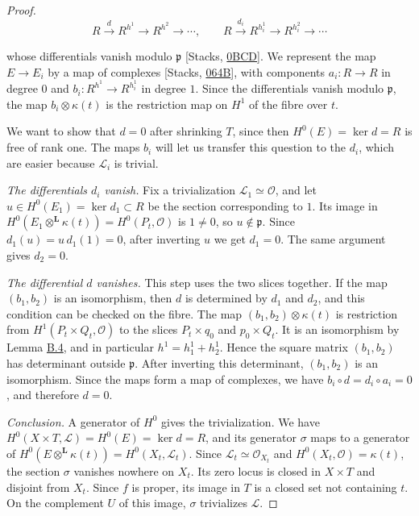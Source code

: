 \documentclass[11pt]{article}
\begin{document}
\begin{proof}[{Proof}]
\[
R\xrightarrow{d}R^{h^1}\to R^{h^2}\to\cdots,\qquad
R\xrightarrow{d_i}R^{h_i^1}\to R^{h_i^2}\to\cdots
\]

whose differentials vanish modulo \(\mathfrak p\) [Stacks, \href{https://stacks.math.columbia.edu/tag/0BCD}{0BCD}]. We represent the map \(E\to E_i\) by a map of complexes [Stacks, \href{https://stacks.math.columbia.edu/tag/064B}{064B}], with components \(a_i:R\to R\) in degree \(0\) and \(b_i:R^{h^1}\to R^{h_i^1}\) in degree \(1\). Since the differentials vanish modulo \(\mathfrak p\), the map \(b_i\otimes\kappa(t)\) is the restriction map on \(H^1\) of the fibre over \(t\).

We want to show that \(d=0\) after shrinking \(T\), since then \(H^0(E)=\ker d=R\) is free of rank one. The maps \(b_i\) will let us transfer this question to the \(d_i\), which are easier because \(\mathcal L_i\) is trivial.

\emph{The differentials \(d_i\) vanish.} Fix a trivialization \(\mathcal L_1\simeq\mathcal O\), and let \(u\in H^0(E_1)=\ker d_1\subset R\) be the section corresponding to \(1\). Its image in \(H^0(E_1\otimes^{\mathbf L}\kappa(t))=H^0(P_t,\mathcal O)\) is \(1\ne0\), so \(u\notin\mathfrak p\). Since \(d_1(u)=u\,d_1(1)=0\), after inverting \(u\) we get \(d_1=0\). The same argument gives \(d_2=0\).

\emph{The differential \(d\) vanishes.} This step uses the two slices together. If the map \((b_1,b_2)\) is an isomorphism, then \(d\) is determined by \(d_1\) and \(d_2\), and this condition can be checked on the fibre. The map \((b_1,b_2)\otimes\kappa(t)\) is restriction from \(H^1(P_t\times Q_t,\mathcal O)\) to the slices \(P_t\times q_0\) and \(p_0\times Q_t\). It is an isomorphism by Lemma \hyperref[bp86]{B.4}, and in particular \(h^1=h_1^1+h_2^1\). Hence the square matrix \((b_1,b_2)\) has determinant outside \(\mathfrak p\). After inverting this determinant, \((b_1,b_2)\) is an isomorphism. Since the maps form a map of complexes, we have \(b_i\circ d=d_i\circ a_i=0\), and therefore \(d=0\).

\emph{Conclusion.} A generator of \(H^0\) gives the trivialization. We have \(H^0(X\times T,\mathcal L)=H^0(E)=\ker d=R\), and its generator \(\sigma\) maps to a generator of \(H^0(E\otimes^{\mathbf L}\kappa(t))=H^0(X_t,\mathcal L_t)\). Since \(\mathcal L_t\simeq\mathcal O_{X_t}\) and \(H^0(X_t,\mathcal O)=\kappa(t)\), the section \(\sigma\) vanishes nowhere on \(X_t\). Its zero locus is closed in \(X\times T\) and disjoint from \(X_t\). Since \(f\) is proper, its image in \(T\) is a closed set not containing \(t\). On the complement \(U\) of this image, \(\sigma\) trivializes \(\mathcal L\).
\end{proof}
\end{document}
